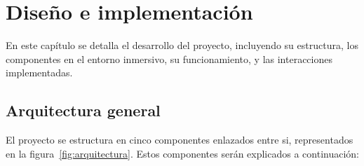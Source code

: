 \documentclass[a4paper, 12pt]{book}
\begin{document}

\cleardoublepage
\chapter{Diseño e implementación}
\label{chap:diseno}

En este capítulo se detalla el desarrollo del proyecto, incluyendo su estructura, los componentes en el entorno 
inmersivo, su funcionamiento, y las interacciones implementadas.


\section{Arquitectura general} 
\label{sec:arquitectura}

El proyecto se estructura en cinco componentes enlazados entre si, representados en la figura~\ref{fig:arquitectura}. Estos componentes serán explicados a continuación:
\end{document}

